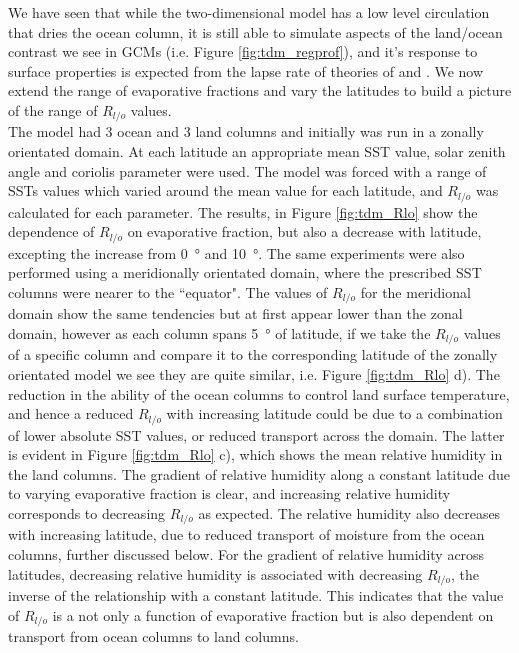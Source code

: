 We have seen that while the two-dimensional model has a low level circulation 
that dries the ocean column, it is still able to simulate aspects of the 
land/ocean contrast we see in GCMs (i.e. Figure \ref{fig:tdm_regprof}), and it's 
response to surface properties is expected from the lapse rate of theories of 
\cite{Joshi2007} and \cite{Byrne2013a}. We now extend the range of evaporative 
fractions and vary the latitudes to build a picture of the range of $R_{l/o}$ 
values.\\
The model had 3 ocean and 3 land columns and initially was run in a zonally 
orientated domain. At each latitude an appropriate mean SST value, solar zenith 
angle and coriolis parameter were used.  The model was forced with a range of 
SSTs values which varied around the mean value for each latitude, and $R_{l/o}$ 
was calculated for each parameter.	The results, in Figure \ref{fig:tdm_Rlo} 
show the dependence of $R_{l/o}$ on evaporative fraction, but also a decrease 
with latitude, excepting the increase from \SI{0}{\degree} and \SI{10}{\degree}.  
The same experiments were also performed using a meridionally orientated domain, 
where the prescribed SST columns were nearer to the ``equator". The values of 
$R_{l/o}$ for the meridional domain show the same tendencies but at first appear 
lower than the zonal domain, however as each column spans \SI{5}{\degree} of 
latitude, if we take the $R_{l/o}$ values of a specific column and compare it to 
the corresponding latitude of the zonally orientated model we see they are quite 
similar, i.e.  Figure \ref{fig:tdm_Rlo} d). The reduction in the ability of the 
ocean columns to control land surface temperature, and hence a reduced $R_{l/o}$ 
with increasing latitude could be due to a combination of lower absolute SST 
values, or reduced transport across the domain. The latter is evident in Figure 
\ref{fig:tdm_Rlo} c), which shows the mean relative humidity in the land 
columns. The gradient of relative humidity along a constant latitude due to 
varying evaporative fraction is clear, and increasing relative humidity 
corresponds to decreasing $R_{l/o}$ as expected.  The relative humidity also 
decreases with increasing latitude, due to reduced transport of moisture from 
the ocean columns, further discussed below.  For the gradient of relative 
humidity across latitudes, decreasing relative humidity is associated with 
decreasing $R_{l/o}$, the inverse of the relationship with a constant latitude.  
This indicates that the value of $R_{l/o}$ is a not only a function of 
evaporative fraction but is also dependent on transport from ocean columns to 
land columns.\\

